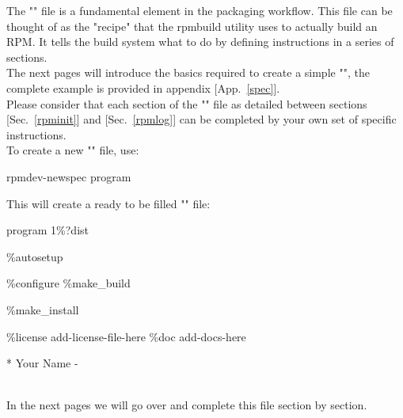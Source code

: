 The "" file is a fundamental element in the packaging workflow. 
This file can be thought of as the "recipe" that the rpmbuild utility uses to actually build an RPM. 
It tells the build system what to do by defining instructions in a series of sections. \\
The next pages will introduce the basics required to create a simple "", 
the complete example is provided in appendix [App.~\ref{spec}]. \\[0.25cm]
Please consider that each section of the "" file as detailed between sections [Sec.~\ref{rpminit}] and [Sec.~\ref{rpmlog}] 
can be completed by your own set of specific instructions. \\[0.25cm] 
\noindent To create a new "" file, use:
\begin{script}
\fprompt{~} rpmdev-newspec program
\end{script}
\clearpage
\noindent This will create a ready to be filled "" file: 
{\footnotesize{
\begin{script}
           program
        1\%{?dist}




\%autosetup

\%configure
\%make\_build

\%make\_install


\%license add-license-file-here
\%doc add-docs-here

*  Your Name \blue{<\email>}
- 
\end{script}
}}
\\
\noindent In the next pages we will go over and complete this file section by section.

